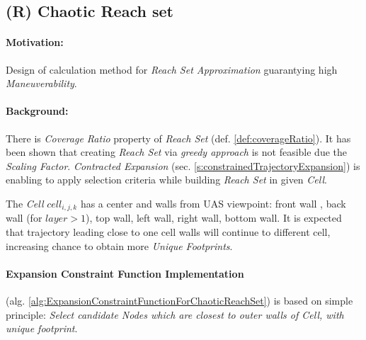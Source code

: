 
\subsection{(R) Chaotic Reach set}\label{s:chaoticReachSet}

\paragraph{Motivation:} Design of calculation method for \emph{Reach Set Approximation} guarantying high \emph{Maneuverability}.

\paragraph{Background:}There is \emph{Coverage Ratio} property of \emph{Reach Set} (def. \ref{def:coverageRatio}). It has been shown that creating \emph{Reach Set} via \emph{greedy approach} is not feasible due the \emph{Scaling Factor}.  \emph{Contracted Expansion} (sec. \ref{s:constrainedTrajectoryExpansion}) is enabling to apply selection criteria while building \emph{Reach Set} in given \emph{Cell}. 

The \emph{Cell} $cell_{i,j,k}$ has a center and walls from UAS viewpoint: front wall , back wall (for $layer > 1$), top wall, left wall, right wall, bottom wall. It is expected that trajectory leading close to one cell walls will continue to different cell, increasing chance to obtain more \emph{Unique Footprints}. 

\paragraph{Expansion Constraint Function Implementation} (alg. \ref{alg:ExpansionConstraintFunctionForChaoticReachSet}) is based on simple principle: \emph{Select candidate Nodes which are  closest to outer walls of Cell, with unique footprint}.

